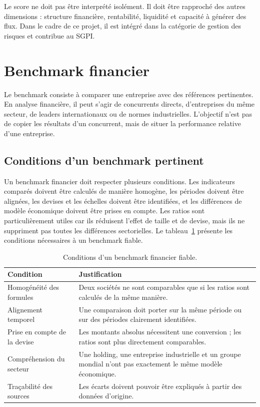 \par Le score ne doit pas être interprété isolément. Il doit être rapproché des
autres dimensions : structure financière, rentabilité, liquidité et capacité à
générer des flux. Dans le cadre de ce projet, il est intégré dans la catégorie
de gestion des risques et contribue au \ac{SGPI}.

\section{Benchmark financier}
\label{sec:benchmark_theorie}
\par Le benchmark consiste à comparer une entreprise avec des références
pertinentes. En analyse financière, il peut s'agir de concurrents directs,
d'entreprises du même secteur, de leaders internationaux ou de normes
industrielles. L'objectif n'est pas de copier les résultats d'un concurrent,
mais de situer la performance relative d'une entreprise.

\subsection{Conditions d'un benchmark pertinent}
\par Un benchmark financier doit respecter plusieurs conditions. Les indicateurs
comparés doivent être calculés de manière homogène, les périodes doivent être
alignées, les devises et les échelles doivent être identifiées, et les
différences de modèle économique doivent être prises en compte. Les ratios sont
particulièrement utiles car ils réduisent l'effet de taille et de devise, mais
ils ne suppriment pas toutes les différences sectorielles. Le
tableau~\ref{tab:benchmark} présente les conditions nécessaires à un benchmark
fiable.

\begin{table}[H]
\centering
\caption[Conditions d'un benchmark financier]{Conditions d'un benchmark financier fiable.}
\label{tab:benchmark}
\begin{tabularx}{\linewidth}{|p{3.4cm}|X|}
\hline
\textbf{Condition} & \textbf{Justification} \\ \hline
Homogénéité des formules & Deux sociétés ne sont comparables que si les ratios sont calculés de la même manière. \\ \hline
Alignement temporel & Une comparaison doit porter sur la même période ou sur des périodes clairement identifiées. \\ \hline
Prise en compte de la devise & Les montants absolus nécessitent une conversion ; les ratios sont plus directement comparables. \\ \hline
Compréhension du secteur & Une holding, une entreprise industrielle et un groupe mondial n'ont pas exactement le même modèle économique. \\ \hline
Traçabilité des sources & Les écarts doivent pouvoir être expliqués à partir des données d'origine. \\ \hline
\end{tabularx}
\end{table}

